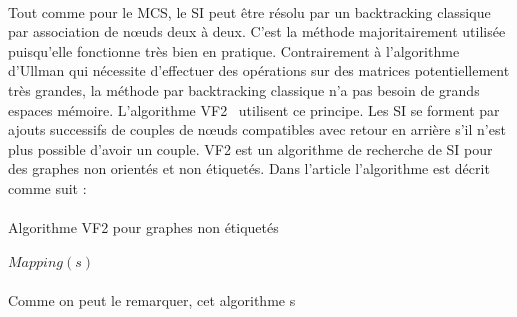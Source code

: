 \documentclass[12pt,french,twoside]{report}
\begin{document}
\paragraph{}Tout comme pour le MCS, le SI peut être résolu par un backtracking classique par association de n\oe{}uds deux à deux.
C'est la méthode majoritairement utilisée puisqu'elle fonctionne très bien en pratique.
Contrairement à l'algorithme d'Ullman qui nécessite d'effectuer des opérations sur des matrices potentiellement très grandes, la méthode par backtracking classique n'a pas besoin de grands espaces mémoire.
L'algorithme VF2~\cite{cordella_subgraph_2004} utilisent ce principe.
Les SI se forment par ajouts successifs de couples de n\oe{}uds compatibles avec retour en arrière s'il n'est plus possible d'avoir un couple.
VF2 est un algorithme de recherche de SI pour des graphes non orientés et non étiquetés.
Dans l'article l'algorithme est décrit comme suit :

\paragraph{}
  \begin{algorithm}[H]
    \caption{Algorithme VF2 pour graphes non étiquetés}
    
     {
      \KwRet $Mapping(s)$\;
    } 
  \end{algorithm}
  
\paragraph{}Comme on peut le remarquer, cet algorithme s
\end{document}
